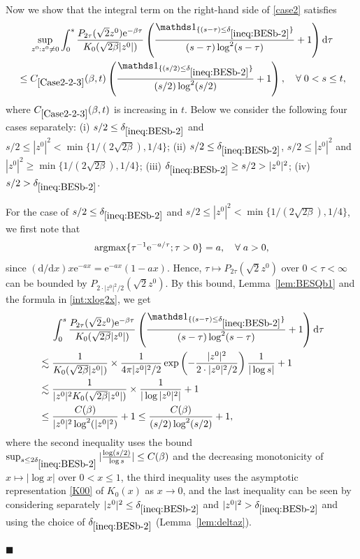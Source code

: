 \documentclass[12pt, twoside]{article}
\numberwithin{figure}{section}
\newcommand{\less}{\lesssim}
\newcommand{\e}{{\mathrm e}}
\newcommand{\1}{\mathds 1}
\renewcommand{\d}{{\mathrm d}}
\newcommand{\2}{{\mathbf 1}}
\renewenvironment{proof}[1][\proofname]{\noindent {\bfseries #1.}\;}{\hfill\ensuremath{\blacksquare}\\}
\newcommand{\cc}{{^\circ}}
\newcommand{\two}{{\sqrt{2}}}
\newcommand{\deltaz}{\delta_{\ref{ineq:BESb-2}}}
\begin{document}
\begin{proof}[Proof of Proposition~\ref{prop:BESmom} (1$\cc$)]
 Now we show that the integral term on the right-hand side of \eqref{case2} satisfies 
\begin{align}
&\quad\;\sup_{z^0:z^0\neq 0}
\int_0^s \frac{P_{2\tau}(\two z^0)\e^{-\beta \tau}}{{K_0(\sqrt{2\beta}|z^0|)}}
\left(\frac{\1_{\{(s-\tau)\leq \deltaz\}}}{(s-\tau)\log^2(s-\tau)}+1\right)\d \tau\notag\\
& \leq C_{\ref{Case2-2-3}}(\beta,t) \left(\frac{\1_{\{(s/2)\leq \deltaz\}}}{(s/2)\log^2(s/2)}+1\right),\quad\forall\;0<s\leq t,\label{Case2-2-3}
\end{align} 
where $C_{\ref{Case2-2-3}}(\beta,t)$ is increasing in $t$. Below we consider the following four cases separately: (i) $s/2\leq \deltaz$ and $s/2\leq |z^0|^2<\min\{1/(2\sqrt{2\beta}),1/4\}$; (ii) $s/2\leq \deltaz$, $s/2\leq |z^0|^2$ and $ |z^0|^2\geq \min\{1/(2\sqrt{2\beta}),1/4\}$; (iii) $\deltaz\geq s/2>|z^0|^2$; (iv) $s/2>\deltaz$. 

For the case of $s/2\leq \deltaz$ and $s/2\leq |z^0|^2<\min\{1/(2\sqrt{2\beta}),1/4\}$,  we first note that
\begin{align}\label{max:tauetau}
{\rm argmax}\{\tau^{-1}\e^{-a/\tau};\tau>0\}=a,\quad \forall\;a>0,
\end{align}
since $(\d/\d x)x\e^{-ax}=\e^{-ax}(1-ax)$. Hence, $\tau\mapsto P_{2\tau}(\two z^0)$ over $0<\tau<\infty$ can be bounded by $P_{2\cdot |z^0|^2/2}(\two z^0)$. By this bound, Lemma~\ref{lem:BESQb1} and the formula in \eqref{int:xlog2x}, we get
\begin{align}
&\quad\;\int_0^s \frac{P_{2\tau}(\two z^0)\e^{-\beta \tau}}{{K_0(\sqrt{2\beta}|z^0|)}}\left(\frac{\1_{\{(s-\tau)\leq \deltaz\}}}{(s-\tau)\log^2(s-\tau)}+1\right)\d \tau\notag\\
&\less \frac{1}{K_0(\sqrt{2\beta}|z^0|)}\times \frac{1}{4\pi |z^0|^2/2}\exp\left(-\frac{|z^0|^2}{2\cdot |z^0|^2/2}\right)\frac{1}{|\log s|}+1\notag\\
&\less \frac{1}{ |z^0|^2K_0(\sqrt{2\beta}|z^0|)}\times\frac{1}{|\log |z^0|^2|}+1\notag\\
&\leq  \frac{C(\beta)}{|z^0|^2\log^2(|z^0|^2)}+1\leq \frac{C(\beta)}{(s/2) \log^2(s/2)}+1,\label{Case2-2-1}
\end{align}
where the second inequality uses the bound $\sup_{s\leq2\deltaz}|\frac{\log (s/2)}{\log s}|\leq C(\beta)$ and the decreasing monotonicity of $x\mapsto |\log x|$ over $0<x\leq 1$, 
the third inequality uses the asymptotic representation \eqref{K00} of $K_0(x)$ as $x\to 0$,
and the last inequality can be seen by considering separately $|z^0|^2\leq \deltaz$ and $|z^0|^2>\deltaz$ and using the choice of $\deltaz$ (Lemma~\ref{lem:deltaz}).


\end{proof}
\end{document}
